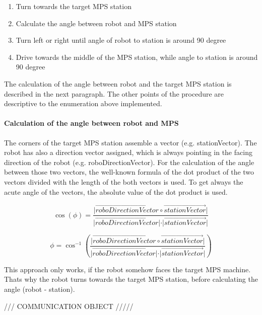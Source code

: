\begin{enumerate}
\item Turn towards the target MPS station
\item Calculate the angle between robot and MPS station
\item Turn left or right until angle of robot to station is around 90 degree
\item Drive towards the middle of the MPS station, while angle to station is around 90 degree
\end{enumerate}

The calculation of the angle between robot and the target MPS station is described in the next paragraph. The other points of the procedure are descriptive to the enumeration above implemented.

\paragraph{Calculation of the angle between robot and MPS}

The corners of the target MPS station assemble a vector (e.g. stationVector). The robot has also a direction vector assigned, which is always pointing in the facing direction of the robot (e.g. roboDirectionVector). For the calculation of the angle between those two vectors, the well-known formula of the dot product of the two vectors divided with the length of the both vectors is used. To get always the acute angle of the vectors, the absolute value of the dot product is used. 

\begin{equation}
\cos(\phi) = \frac{ \vert \overrightarrow{roboDirectionVector} \circ \overrightarrow{stationVector} \vert} { \vert \overrightarrow{roboDirectionVector}  \vert  \cdot \vert \overrightarrow{stationVector}  \vert}
\end{equation}

\begin{equation}
\phi = \cos ^{ - 1} \left( \frac{ \vert \overrightarrow{roboDirectionVector} \circ \overrightarrow{stationVector} \vert} { \vert \overrightarrow{roboDirectionVector}  \vert  \cdot \vert \overrightarrow{stationVector}  \vert} \right)
\end{equation}


This approach only works, if the robot somehow faces the target MPS machine. Thats why the robot turns towards the target MPS station, before calculating the angle (robot - station). 

/// COMMUNICATION OBJECT /////

